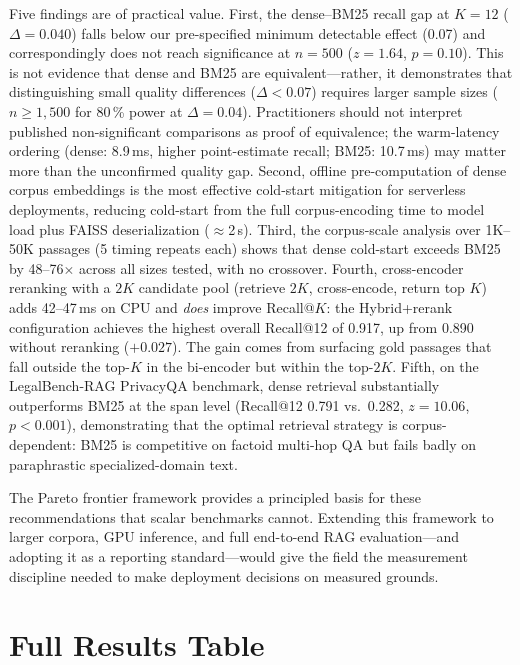 \documentclass[11pt,a4paper]{article}
\begin{document}
Five findings are of practical value.
First, the dense--BM25 recall gap at $K=12$ ($\Delta = 0.040$) falls below our
pre-specified minimum detectable effect (0.07) and correspondingly does not
reach significance at $n=500$ ($z=1.64$, $p=0.10$).
This is not evidence that dense and BM25 are equivalent---rather, it
demonstrates that distinguishing small quality differences ($\Delta < 0.07$)
requires larger sample sizes ($n \geq 1{,}500$ for 80\,\% power at
$\Delta = 0.04$).
Practitioners should not interpret published non-significant comparisons as
proof of equivalence; the warm-latency ordering (dense: 8.9\,ms, higher
point-estimate recall; BM25: 10.7\,ms) may matter more than the unconfirmed
quality gap.
Second, offline pre-computation of dense corpus embeddings is the most
effective cold-start mitigation for serverless deployments, reducing
cold-start from the full corpus-encoding time to model load plus FAISS
deserialization ($\approx$2\,s).
Third, the corpus-scale analysis over 1K--50K passages (5 timing repeats
each) shows that dense cold-start exceeds BM25 by 48--76$\times$ across all
sizes tested, with no crossover.
Fourth, cross-encoder reranking with a $2K$ candidate pool (retrieve $2K$,
cross-encode, return top $K$) adds 42--47\,ms on CPU and \emph{does} improve
Recall@$K$: the Hybrid+rerank configuration achieves the highest overall
Recall@12 of 0.917, up from 0.890 without reranking ($+0.027$).
The gain comes from surfacing gold passages that fall outside the top-$K$
in the bi-encoder but within the top-$2K$.
Fifth, on the LegalBench-RAG PrivacyQA benchmark, dense retrieval
substantially outperforms BM25 at the span level (Recall@12 0.791 vs.\ 0.282,
$z=10.06$, $p<0.001$), demonstrating that the optimal retrieval strategy is
corpus-dependent: BM25 is competitive on factoid multi-hop QA but fails badly
on paraphrastic specialized-domain text.

The Pareto frontier framework provides a principled basis for these
recommendations that scalar benchmarks cannot.
Extending this framework to larger corpora, GPU inference, and full end-to-end
RAG evaluation---and adopting it as a reporting standard---would give the field
the measurement discipline needed to make deployment decisions on measured
grounds.




\clearpage
\appendix
\section{Full Results Table}
\label{app:full_results}
\end{document}
